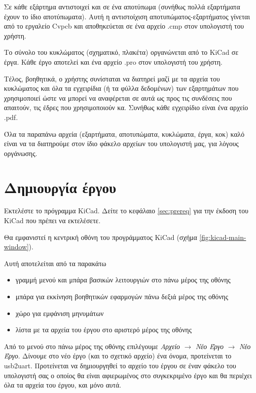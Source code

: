 \documentclass[a4paper]{article}
\begin{document}
Σε κάθε εξάρτημα αντιστοιχεί και σε ένα αποτύπωμα (συνήθως πολλά εξαρτήματα έχουν το ίδιο αποτύπωματα). Αυτή η αντιστοίχιση αποτυπώματος-εξαρτήματος γίνεται από το εργαλείο \textenglish{Cvpcb} και αποθηκεύεται σε ένα αρχείο .cmp στον υπολογιστή του χρήστη. 

Το σύνολο του κυκλώματος (σχηματικό, πλακέτα) οργανώνεται από το \textenglish{KiCad} σε έργα. Κάθε έργο αποτελεί και ένα αρχείο .pro στον υπολογιστή του χρήστη. 

Τέλος, βοηθητικά, ο χρήστης συνίσταται να διατηρεί μαζί με τα αρχεία του κυκλώματος και όλα τα εγχειρίδια (ή τα φύλλα δεδομένων) των εξαρτημάτων που χρησιμοποιεί ώστε να μπορεί να αναφέρεται σε αυτά ως προς τις συνδέσεις που απαιτούν, τις έδρες που χρησιμοποιούν κα. Συνήθως κάθε εγχειρίδιο είναι ένα αρχείο .pdf.

Όλα τα παραπάνω αρχεία (εξαρτήματα, αποτυπώματα, κυκλώματα, έργα, κοκ) καλό είναι να τα διατηρούμε στον ίδιο φάκελο αρχείων του υπολογιστή μας, για λόγους οργάνωσης.  
    
\newpage
\section{Δημιουργία έργου}
Εκτελέστε το πρόγραμμα \textenglish{KiCad}. Δείτε το κεφάλαιο \ref{sec:prereq} για την έκδοση του \textenglish{KiCad} που πρέπει να εκτελέσετε.

Θα εμφανιστεί η κεντρική οθόνη του προγράμματος \textenglish{KiCad} (σχήμα \ref{fig:kicad-main-window}). 

Αυτή αποτελείται από τα παρακάτω
\begin{itemize}
    \item γραμμή μενού και μπάρα βασικών λειτουργιών στο πάνω μέρος της οθόνης
    \item μπάρα για εκκίνηση βοηθητικών εφαρμογών πάνω δεξιά μέρος της οθόνης
    \item χώρο για εμφάνιση μηνυμάτων
    \item λίστα με τα αρχεία του έργου στο αριστερό μέρος της οθόνης
\end{itemize}

Από το μενού στο πάνω μέρος της οθόνης επιλέγουμε \textit{Αρχείο $\rightarrow$ Νέο Έργο $\rightarrow$ Νέο Έργο}. Δίνουμε στο νέο έργο (και το σχετικό αρχείο) ένα όνομα, προτείνεται το usb2uart. Προτείνεται να δημιουργηθεί το αρχείο του έργου σε έναν φάκελο του υπολογιστή σας ο οποίος θα είναι αφιερωμένος στο συγκεκριμένο έργο και θα περιέχει όλα τα αρχεία του έργου, και μόνο αυτά.
\end{document}

